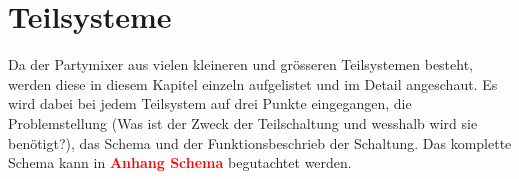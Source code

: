 \section{Teilsysteme}
\label{sec:Teilsysteme}

Da der Partymixer aus vielen kleineren und grösseren Teilsystemen besteht, werden diese in diesem Kapitel einzeln aufgelistet und im Detail angeschaut.
Es wird dabei bei jedem Teilsystem auf drei Punkte eingegangen, die Problemstellung (Was ist der Zweck der Teilschaltung und wesshalb wird sie benötigt?), das Schema und der Funktionsbeschrieb der Schaltung. Das komplette Schema kann in  \textcolor{red}{\textbf{Anhang Schema}} begutachtet werden.